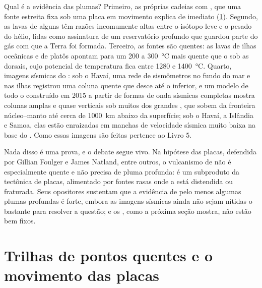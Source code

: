 Qual é a evidência das plumas? Primeiro, as próprias cadeias com , que uma fonte estreita fixa sob uma placa em movimento explica de imediato (\cref{sec:b1:hotspots:tracks}). Segundo, as lavas de alguns  têm razões incomumente altas entre o isótopo leve e o pesado do hélio, lidas como assinatura de um reservatório profundo que guardou parte do gás com que a Terra foi formada. Terceiro, as fontes são quentes: as lavas de ilhas oceânicas e de platôs apontam para um  200 a \qty{300}{\celsius} mais quente que o  sob as dorsais, cujo potencial de temperatura fica entre 1280 e \qty{1400}{\celsius}. Quarto, imagens sísmicas do : sob o Havaí, uma rede de sismômetros no fundo do mar e nas ilhas registrou uma coluna quente que desce até o  inferior, e um modelo de todo o  construído em 2015 a partir de formas de onda sísmicas completas mostra colunas amplas e quase verticais sob muitos dos grandes , que sobem da fronteira núcleo--manto até cerca de \qty{1000}{km} abaixo da superfície; sob o Havaí, a Islândia e Samoa, elas estão enraizadas em manchas de velocidade sísmica muito baixa na base do . Como essas imagens são feitas pertence ao Livro 5.

Nada disso é uma prova, e o debate segue vivo. Na hipótese das placas, defendida por Gillian Foulger e James Natland, entre outros, o vulcanismo de  não é especialmente quente e não precisa de pluma profunda: é um subproduto da tectônica de placas, alimentado por fontes rasas onde a  está distendida ou fraturada. Seus opositores sustentam que a evidência de pelo menos algumas plumas profundas é forte, embora as imagens sísmicas ainda não sejam nítidas o bastante para resolver a questão; e os , como a próxima seção mostra, não estão bem fixos.

\section{Trilhas de pontos quentes e o movimento das placas}\label{sec:b1:hotspots:tracks}

